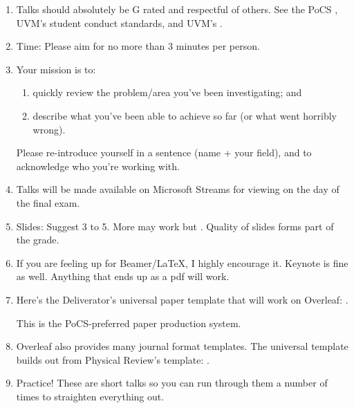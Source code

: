 \begin{enumerate}
\item 
  Talks should absolutely be G rated and respectful of others.
  See the PoCS
  ,
  UVM's student conduct standards, and UVM's
  .

\item
  Time: Please aim for no more than 3 minutes per person.

\item
  Your mission is to:
  \begin{enumerate}
  \item
    quickly review the problem/area you've been investigating; and
  \item
    describe what you've been able to achieve so far (or what went horribly wrong).
  \end{enumerate}

  Please re-introduce yourself in a sentence (name + your field),
  and to acknowledge who you're working with.

\item
  Talks will be made available on Microsoft Streams for viewing on the day of the final exam.

\item
  Slides: Suggest 3 to 5.  More may work but
  . Quality of slides forms part of the grade.

\item
  If you are feeling up for Beamer/LaTeX, I highly encourage it. Keynote is fine as well. Anything that ends up as a pdf will work.

\item
  Here's the Deliverator's universal paper template that will work on Overleaf:
  .

  This is the PoCS-preferred paper production system.
\item
  Overleaf also provides many journal format templates. The universal template builds out from Physical Review's template:
  .

\item
  Practice!  These are short talks so you can run through
  them a number of times to straighten everything out.


\end{enumerate}

